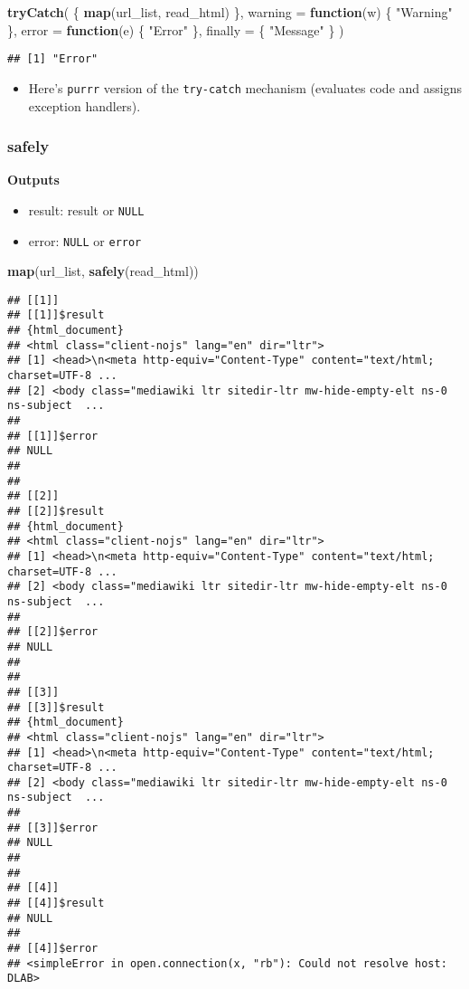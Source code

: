 \documentclass[
]{book}
\newenvironment{Shaded}{\begin{snugshade}}{\end{snugshade}}
\newcommand{\ControlFlowTok}[1]{\textcolor[rgb]{0.13,0.29,0.53}{\textbf{#1}}}
\newcommand{\DataTypeTok}[1]{\textcolor[rgb]{0.13,0.29,0.53}{#1}}
\newcommand{\KeywordTok}[1]{\textcolor[rgb]{0.13,0.29,0.53}{\textbf{#1}}}
\newcommand{\NormalTok}[1]{#1}
\newcommand{\StringTok}[1]{\textcolor[rgb]{0.31,0.60,0.02}{#1}}
\providecommand{\tightlist}{%
  \setlength{\itemsep}{0pt}\setlength{\parskip}{0pt}}
\begin{document}
\begin{Shaded}
\begin{Highlighting}[]
\KeywordTok{tryCatch}\NormalTok{(}
\NormalTok{  \{}
    \KeywordTok{map}\NormalTok{(url\_list, read\_html)}
\NormalTok{  \},}
  \DataTypeTok{warning =} \ControlFlowTok{function}\NormalTok{(w) \{}
    \StringTok{"Warning"}
\NormalTok{  \},}
  \DataTypeTok{error =} \ControlFlowTok{function}\NormalTok{(e) \{}
    \StringTok{"Error"}
\NormalTok{  \},}
  \DataTypeTok{finally =}\NormalTok{ \{}
    \StringTok{"Message"}
\NormalTok{  \}}
\NormalTok{)}
\end{Highlighting}
\end{Shaded}

\begin{verbatim}
## [1] "Error"
\end{verbatim}

\begin{itemize}
\tightlist
\item
  Here's \texttt{purrr} version of the \texttt{try-catch} mechanism (evaluates code and assigns exception handlers).
\end{itemize}

\hypertarget{safely}{%
\subsubsection{safely}\label{safely}}

\textbf{Outputs}

\begin{itemize}
\tightlist
\item
  result: result or \texttt{NULL}
\item
  error: \texttt{NULL} or \texttt{error}
\end{itemize}

\begin{Shaded}
\begin{Highlighting}[]
\KeywordTok{map}\NormalTok{(url\_list, }\KeywordTok{safely}\NormalTok{(read\_html))}
\end{Highlighting}
\end{Shaded}

\begin{verbatim}
## [[1]]
## [[1]]$result
## {html_document}
## <html class="client-nojs" lang="en" dir="ltr">
## [1] <head>\n<meta http-equiv="Content-Type" content="text/html; charset=UTF-8 ...
## [2] <body class="mediawiki ltr sitedir-ltr mw-hide-empty-elt ns-0 ns-subject  ...
## 
## [[1]]$error
## NULL
## 
## 
## [[2]]
## [[2]]$result
## {html_document}
## <html class="client-nojs" lang="en" dir="ltr">
## [1] <head>\n<meta http-equiv="Content-Type" content="text/html; charset=UTF-8 ...
## [2] <body class="mediawiki ltr sitedir-ltr mw-hide-empty-elt ns-0 ns-subject  ...
## 
## [[2]]$error
## NULL
## 
## 
## [[3]]
## [[3]]$result
## {html_document}
## <html class="client-nojs" lang="en" dir="ltr">
## [1] <head>\n<meta http-equiv="Content-Type" content="text/html; charset=UTF-8 ...
## [2] <body class="mediawiki ltr sitedir-ltr mw-hide-empty-elt ns-0 ns-subject  ...
## 
## [[3]]$error
## NULL
## 
## 
## [[4]]
## [[4]]$result
## NULL
## 
## [[4]]$error
## <simpleError in open.connection(x, "rb"): Could not resolve host: DLAB>
\end{verbatim}
\end{document}
